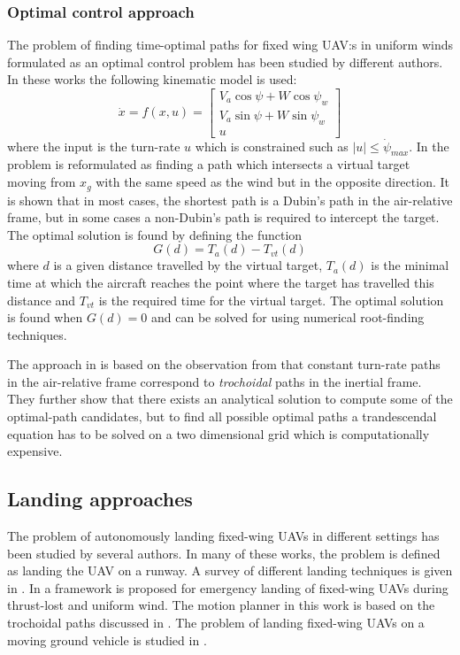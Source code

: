 \subsubsection{Optimal control approach}
The problem of finding time-optimal paths for fixed wing UAV:s in uniform winds formulated as an optimal control problem has been studied
by different authors. In these works the following kinematic model is used:
\begin{equation}
    \dot{x}=f(x, u)=
    \begin{bmatrix}
        V_a\cos\psi + W\cos\psi_w\\
        V_a\sin\psi + W\sin\psi_w\\
        u    
    \end{bmatrix} 
\end{equation}
where the input is the turn-rate $u$ which is constrained such as $|u|\leq\dot{\psi}_{max}$.
In \cite{optimal_path_target} the problem is reformulated as finding a path which 
intersects a virtual target moving from $x_g$ with the same speed as the wind but in the opposite direction. It is shown that in most cases,
the shortest path is a Dubin's path in the air-relative frame, but in some cases a non-Dubin's path is required to 
intercept the target. The optimal solution is found by defining the function
\begin{equation}
    G(d)=T_a(d) - T_{vt}(d)
\end{equation}
where $d$ is a given distance travelled by the virtual target, $T_a(d)$ is the minimal time at which the 
aircraft reaches the point where the target has travelled this distance and $T_{vt}$ is the required time for the virtual target. 
The optimal solution is found when $G(d)=0$ and can be solved for using numerical root-finding techniques.

The approach in \cite{optimal_path_trochoidal} is based on the observation from \cite{course_hdg_wind} that 
constant turn-rate paths in the air-relative frame correspond to \textit{trochoidal} paths in the inertial frame. 
They further show that there exists an analytical solution to compute some of the optimal-path candidates, but to find 
all possible optimal paths a trandescendal equation has to be solved on a two dimensional grid which is computationally expensive.

\subsection{Landing approaches}
The problem of autonomously landing fixed-wing UAVs in different settings has been studied by several authors. 
In many of these works, the problem is defined as landing the UAV on a runway. A survey of different landing techniques is given in \cite{survey_landing}.
In \cite{emergency_landing} a framework is proposed for emergency landing of fixed-wing UAVs during thrust-lost and uniform wind. The motion planner in this work is based on the 
trochoidal paths discussed in \cite{optimal_path_trochoidal}. The problem of landing fixed-wing UAVs on a moving ground vehicle is studied in \cite{landing_on_vehicle}.